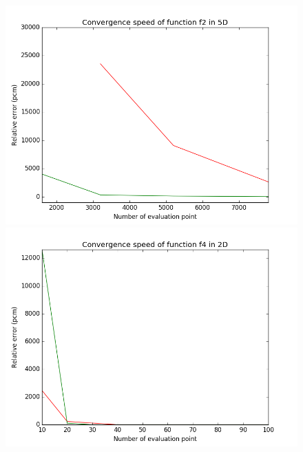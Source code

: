 \begin{figure}[h]  \ContinuedFloat
	 \begin{minipage}[b]{0.32\linewidth}
      \centering \includegraphics[scale=0.3]{images/f2_5d.png}
   \end{minipage}
		\begin{minipage}[b]{0.32\linewidth}
				\centering \includegraphics[scale=0.3]{images/f4_2d.png}
		\end{minipage}
		\begin{minipage}[b]{0.32\linewidth}

\end{minipage}
\end{figure}
